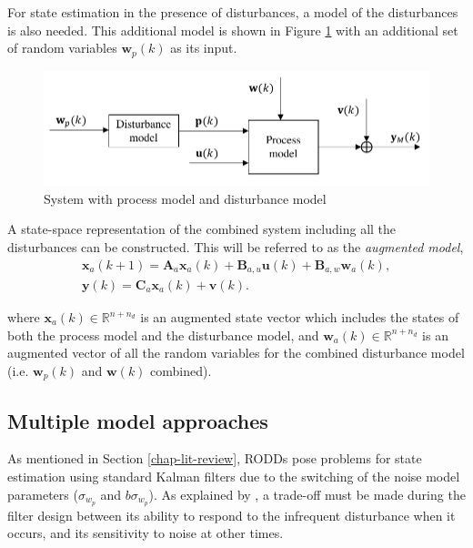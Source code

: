 For state estimation in the presence of disturbances, a model of the disturbances is also needed. This additional model is shown in Figure \ref{fig:model_diag_wpupwvy} with an additional set of random variables $\mathbf{w}_p(k)$ as its input.

\begin{figure}[htp]
	\centering
	\includegraphics[width=12.5cm]{images/model_diag_wpupwvy.pdf}
	\caption{System with process model and disturbance model}
	\label{fig:model_diag_wpupwvy}
\end{figure}

A state-space representation of the combined system including all the disturbances can be constructed. This will be referred to as the \textit{augmented model},
\begin{equation} \label{eq:ss_rep_xa}
	\begin{aligned}
		\mathbf{x}_a(k+1) = \mathbf{A}_a \mathbf{x}_a(k) + \mathbf{B}_{a,u} \mathbf{u}(k) + \mathbf{B}_{a,w} \mathbf{w}_{a}(k), \\
		\mathbf{y}(k) = \mathbf{C}_a \mathbf{x}_a(k) + \mathbf{v}(k).
	\end{aligned}
\end{equation}

where $\mathbf{x}_a(k) \in \mathbb{R}^{n+n_d}$ is an augmented state vector which includes the states of both the process model and the disturbance model, and $\mathbf{w}_a(k) \in \mathbb{R}^{n+n_d}$ is an augmented vector of all the random variables for the combined disturbance model (i.e. $\mathbf{w}_p(k)$ and $\mathbf{w}(k)$ combined).


\subsection{Multiple model approaches}

As mentioned in Section \ref{chap-lit-review}, RODDs pose problems for state estimation using standard Kalman filters due to the switching of the noise model parameters ($\sigma_{w_p}$ and $b$$\sigma_{w_p}$). As explained by \cite{robertson_detection_1995}, a trade-off must be made during the filter design between its ability to respond to the infrequent disturbance when it occurs, and its sensitivity to noise at other times.

